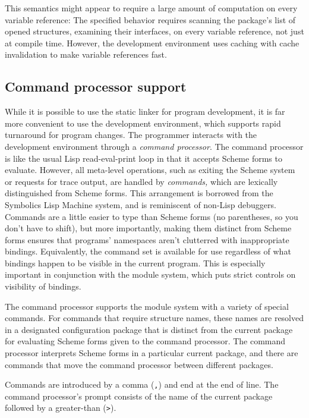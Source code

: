 This semantics might appear to require a large amount of computation
on every variable reference: The specified behavior requires scanning
the package's list of opened structures, examining their interfaces,
on every variable reference, not just at compile time.  However, the
development environment uses caching with cache invalidation to make
variable references fast.


\subsection*{Command processor support}

While it is possible to use the \hack{} static linker for program
development, it is far more convenient to use the development
environment, which supports rapid turnaround for program changes.  The
programmer interacts with the development environment through a {\em
command processor}.  The command processor is like the usual Lisp
read-eval-print loop in that it accepts Scheme forms to evaluate.
However, all meta-level operations, such as exiting the Scheme system
or requests for trace output, are handled by {\em commands,} which are
lexically distinguished from Scheme forms.  This arrangement is
borrowed from the Symbolics Lisp Machine system, and is reminiscent of
non-Lisp debuggers.  Commands are a little easier to type than Scheme
forms (no parentheses, so you don't have to shift), but more
importantly, making them distinct from Scheme forms ensures that
programs' namespaces aren't clutterred with inappropriate bindings.
Equivalently, the command set is available for use regardless of what
bindings happen to be visible in the current program.  This is
especially important in conjunction with the module system, which puts
strict controls on visibility of bindings.

The \hack{} command processor supports the module system with a
variety of special commands.  For commands that require structure
names, these names are resolved in a designated configuration package
that is distinct from the current package for evaluating Scheme forms
given to the command processor.  The command processor interprets
Scheme forms in a particular current package, and there are commands
that move the command processor between different packages.

Commands are introduced by a comma ({\tt,}) and end at the end of
line.  The command processor's prompt consists of the name of the
current package followed by a greater-than ({\tt>}).

